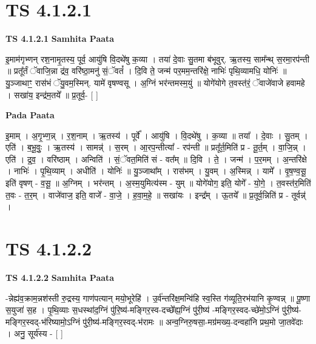 \documentclass[17pt]{extarticle}
\begin{document}

\section{ TS 4.1.2.1 }

\textbf{TS 4.1.2.1 } \newline
\textbf{Samhita Paata} \newline

इ॒माम॑गृभ्णन् रश॒नामृ॒तस्य॒ पूर्व॒ आयु॑षि वि॒दथे॑षु क॒व्या । तया॑ दे॒वाः सु॒तमा ब॑भूवुर्. ऋ॒तस्य॒ साम᳚न्थ् स॒रमा॒रप॑न्ती ॥ प्रतू᳚र्तं ॅवाजि॒न्ना द्र॑व॒ वरि॑ष्ठा॒मनु॑ सं॒ॅवतं᳚ । दि॒वि ते॒ जन्म॑ पर॒मम॒न्तरि॑क्षे॒ नाभिः॑ पृथि॒व्यामधि॒ योनिः॑ ॥ यु॒ञ्जाथाꣳ॒॒ रास॑भं ॅयु॒वम॒स्मिन्. यामे॑ वृषण्वसू । अ॒ग्निं भर॑न्तमस्म॒युं ॥ योगे॑योगे त॒वस्त॑रं॒ ॅवाजे॑वाजे हवामहे । सखा॑य॒ इन्द्र॑म॒तये᳚ ॥ प्र॒तूर्व॒- [  ] \newline

\textbf{Pada Paata} \newline

इ॒माम् । अ॒गृ॒भ्ण॒न्न् । र॒श॒नाम् । ऋ॒तस्य॑ । पूर्वे᳚ । आयु॑षि । वि॒दथे॑षु । क॒व्या ॥ तया᳚ । दे॒वाः । सु॒तम् । एति॑ । ब॒भू॒वुः॒ । ऋ॒तस्य॑ । सामन्न्॑ । स॒रम् । आ॒रप॒न्तीत्या᳚ - रप॑न्ती ॥ प्रतू᳚र्त॒मिति॑ प्र - तू॒र्त॒म् । वा॒जि॒न्न् । एति॑ । द्र॒व॒ । वरि॑ष्ठाम् । अन्विति॑ । सं॒ॅवत॒मिति॑ सं - वत᳚म् ॥ दि॒वि । ते॒ । जन्म॑ । प॒र॒मम् । अ॒न्तरि॑क्षे । नाभिः॑ । पृ॒थि॒व्याम् । अधीति॑ । योनिः॑ ॥ यु॒ञ्जाथा᳚म् । रास॑भम् । यु॒वम् । अ॒स्मिन्न् । यामे᳚ । वृ॒ष॒ण्व॒सू॒ इति॑ वृषण् - व॒सू॒ ॥ अ॒ग्निम् । भर॑न्तम् । अ॒स्म॒युमित्य॑स्म - युम् ॥ योगे॑योग॒ इति॒ योगे᳚ - यो॒गे॒ । त॒वस्त॑र॒मिति॑ त॒वः - त॒र॒म् । वाजे॑वाज॒ इति॒ वाजे᳚ - वा॒जे॒ । ह॒वा॒म॒हे॒ ॥ सखा॑यः । इन्द्र᳚म् । ऊ॒तये᳚ ॥ प्र॒तूर्व॒न्निति॑ प्र - तूर्वन्न्॑ ।  \newline





\section{ TS 4.1.2.2 }

\textbf{TS 4.1.2.2 } \newline
\textbf{Samhita Paata} \newline

-न्नेह्य॑व॒क्राम॒न्नश॑स्ती रु॒द्रस्य॒ गाण॑पत्यान् मयो॒भूरेहि॑ । उ॒र्व॑न्तरि॑क्ष॒मन्वि॑हि स्व॒स्ति ग॑व्यूति॒रभ॑यानि कृ॒ण्वन्न् ॥ पू॒ष्णा स॒युजा॑ स॒ह । पृ॒थि॒व्याः स॒धस्था॑द॒ग्निं पु॑रि॒ष्य॑-मङ्गिर॒स्व-दच्छे᳚ह्य॒ग्निं पु॑री॒ष्य॑ -मङ्गिर॒स्वद-च्छे॑मो॒ऽग्निं पु॑री॒ष्य॑-मङ्गिर॒स्वद्-भ॑रिष्यामो॒ऽग्निं पु॑री॒ष्य॑-मङ्गिर॒स्वद्-भ॑रामः ॥ अन्व॒ग्निरु॒षसा॒-मग्र॑मख्य॒-दन्वहा॑नि प्रथ॒मो जा॒तवे॑दाः । अनु॒ सूर्य॑स्य - [  ] \newline
\end{document}
